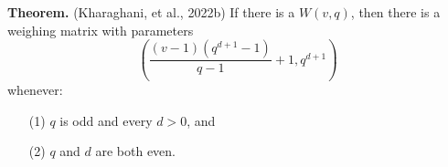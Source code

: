 \documentclass{beamer}
\newcommand{\BB}[1]{\textcolor{blue}{#1}}
\begin{document}
  

\begin{frame}

  \begin{block}{{\bf Theorem.} (Kharaghani, et al., 2022b)}
    If there is a $W(v,q)$, then there is a weighing matrix with parameters
    \[
      \left(
        \frac{(v-1)(q^{d+1}-1)}{q-1}+1, q^{d+1}
      \right)
    \]
    whenever:
    \begin{itemize}
    \item[(1)] $q$ is odd and every $d>0$, and
    \item[(2)] $q$ and $d$ are both even.
    \end{itemize}
  \end{block}

\end{frame}
\end{document}
